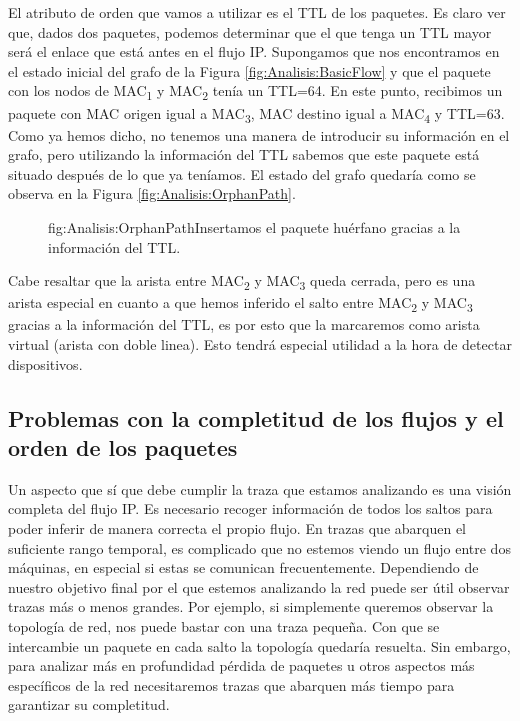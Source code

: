 \documentclass[tfg,epsbased,lof,lot,loa,covers,final,copyright,overleaf]{tfgtfmthesisuam}
\begin{document}
El atributo de orden que vamos a utilizar es el TTL de los paquetes. Es claro ver que, dados dos paquetes, podemos determinar que el que tenga un TTL mayor será el enlace que está antes en el flujo IP. Supongamos que nos encontramos en el estado inicial del grafo de la Figura \ref{fig:Analisis:BasicFlow} y que el paquete con los nodos de MAC\textsubscript{1} y MAC\textsubscript{2} tenía un TTL=64. En este punto, recibimos un paquete con MAC origen igual a MAC\textsubscript{3}, MAC destino igual a MAC\textsubscript{4} y TTL=63. Como ya hemos dicho, no tenemos una manera de introducir su información en el grafo, pero utilizando la información del TTL sabemos que este paquete está situado después de lo que ya teníamos. El estado del grafo quedaría como se observa en la Figura \ref{fig:Analisis:OrphanPath}.

\begin{figure}[Ejemplo de resolución de camino huérfano]{fig:Analisis:OrphanPath}{Insertamos el paquete huérfano gracias a la información del TTL.}
    
\end{figure}

Cabe resaltar que la  arista entre MAC\textsubscript{2} y MAC\textsubscript{3} queda cerrada, pero es una arista especial en cuanto a que hemos inferido el salto entre MAC\textsubscript{2} y MAC\textsubscript{3} gracias a la información del TTL, es por esto que la marcaremos como arista virtual (arista con doble linea). Esto tendrá especial utilidad a la hora de detectar dispositivos.

\subsection{Problemas con la completitud de los flujos y el orden de los paquetes}
Un aspecto que sí que debe cumplir la traza que estamos analizando es una visión completa del flujo IP. Es necesario recoger información de todos los saltos para poder inferir de manera correcta el propio flujo. En trazas que abarquen el suficiente rango temporal, es complicado que no estemos viendo un flujo entre dos máquinas, en especial si estas se comunican frecuentemente. Dependiendo de nuestro objetivo final por el que estemos analizando la red puede ser útil observar trazas más o menos grandes. Por ejemplo, si simplemente queremos observar la topología de red, nos puede bastar con una traza pequeña. Con que se intercambie un paquete en cada salto la topología quedaría resuelta. Sin embargo, para analizar más en profundidad pérdida de paquetes u otros aspectos más específicos de la red necesitaremos trazas que abarquen más tiempo para garantizar su completitud.
\end{document}
